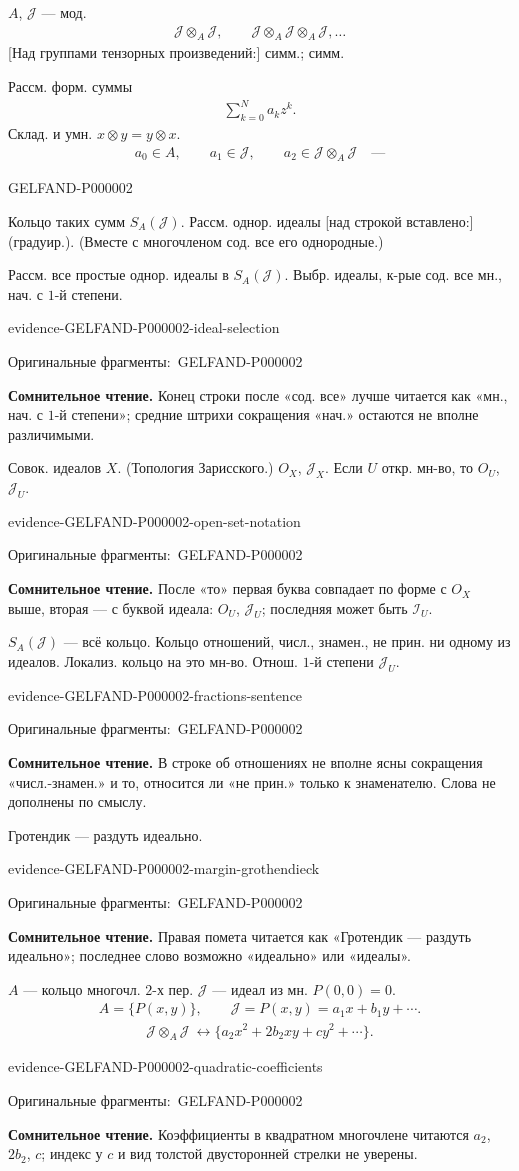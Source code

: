 \documentclass[11pt]{article}
\newcommand{\SourcePage}[2]{\par\smallskip\phantomsection\label{#1:source-page}{\small\sffamily\color{blue!55!black}#1}\par\smallskip}
\newcommand{\EvidenceBlock}[4]{%
 \par\smallskip\noindent\begin{minipage}{\linewidth}
 \begin{minipage}[t]{.47\linewidth}\vspace{0pt}\centering
 \csname evidence-#1-#2\endcsname\par
 {\scriptsize\SourceCropCaption\ #1}\par
 \end{minipage}\hfill
 \begin{minipage}[t]{.49\linewidth}\vspace{0pt}\raggedright
 {\small\color{orange!65!black}\textbf{#4} #3}\par
 \end{minipage}
 \end{minipage}\par\smallskip}
\newcommand{\Unclear}[3]{\EvidenceBlock{#1}{#2}{#3}{\ReadingCaption}}
\newcommand{\SourceCropCaption}{Оригинальные фрагменты:}\newcommand{\ReadingCaption}{Сомнительное чтение.}\newcommand{\IncompleteCaption}{Неразобранный фрагмент.}\newcommand{\DiagramCaption}{Рисунок и набранное описание.}
\begin{document}
$A$, $\mathcal{J}$ — мод.
\begin{gather*}
 \mathcal{J}\otimes_A\mathcal{J},\qquad
 \mathcal{J}\otimes_A\mathcal{J}\otimes_A\mathcal{J},\ldots
\end{gather*}
[Над группами тензорных произведений:] симм.; симм.

Рассм. форм. суммы
\begin{gather*}
 \sum_{k=0}^{N}a_kz^k.
\end{gather*}
Склад. и умн.
$x\otimes y=y\otimes x$.
\begin{gather*}
 a_0\in A,\qquad a_1\in\mathcal{J},\qquad
 a_2\in\mathcal{J}\otimes_A\mathcal{J}\quad\text{—}
\end{gather*}

\SourcePage{GELFAND-P000002}{unlabelled}
Кольцо таких сумм $S_A(\mathcal{J})$.
Рассм. однор. идеалы
[над строкой вставлено:] (градуир.).
(Вместе с многочленом сод. все его однородные.)

Рассм. все простые однор. идеалы в $S_A(\mathcal{J})$.
Выбр. идеалы, к-рые сод. все мн., нач. с $1$-й степени.
\Unclear{GELFAND-P000002}{ideal-selection}{Конец строки после «сод. все» лучше читается как «мн., нач. с $1$-й степени»; средние штрихи сокращения «нач.» остаются не вполне различимыми.}

Совок. идеалов $X$. (Топология Зарисского.)
$O_X$, $\mathcal{J}_X$.
Если $U$ откр. мн-во, то $O_U$, $\mathcal{J}_U$.
\Unclear{GELFAND-P000002}{open-set-notation}{После «то» первая буква совпадает по форме с $O_X$ выше, вторая — с буквой идеала: $O_U$, $\mathcal{J}_U$; последняя может быть $\mathcal{I}_U$.}

$S_A(\mathcal{J})$ — всё кольцо.
Кольцо отношений, числ., знамен., не прин. ни одному из идеалов.
Локализ. кольцо на это мн-во.
Отнош. $1$-й степени $\mathcal{J}_U$.
\Unclear{GELFAND-P000002}{fractions-sentence}{В строке об отношениях не вполне ясны сокращения «числ.-знамен.» и то, относится ли «не прин.» только к знаменателю. Слова не дополнены по смыслу.}
[Справа, две стрелки вниз:] Гротендик — раздуть идеально.
\Unclear{GELFAND-P000002}{margin-grothendieck}{Правая помета читается как «Гротендик — раздуть идеально»; последнее слово возможно «идеально» или «идеалы».}

$A$ — кольцо многочл. $2$-х пер.
$\mathcal{J}$ — идеал из мн. $P(0,0)=0$.
\begin{gather*}
 A=\{P(x,y)\},\qquad
 \mathcal{J}=P(x,y)=a_1x+b_1y+\cdots .
\end{gather*}
\begin{gather*}
 \mathcal{J}\otimes_A\mathcal{J}\ \longleftrightarrow
 \{a_2x^2+2b_2xy+cy^2+\cdots\}.
\end{gather*}
\Unclear{GELFAND-P000002}{quadratic-coefficients}{Коэффициенты в квадратном многочлене читаются $a_2$, $2b_2$, $c$; индекс у $c$ и вид толстой двусторонней стрелки не уверены.}
\end{document}
